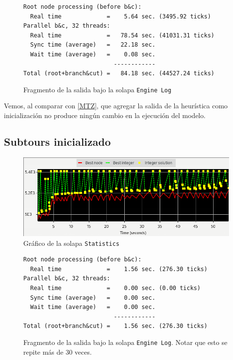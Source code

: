 \documentclass[titlepage,a4paper,oneside]{article}
\begin{document}
\begin{figure}[H]
\begin{verbatim}
Root node processing (before b&c):
  Real time             =    5.64 sec. (3495.92 ticks)
Parallel b&c, 32 threads:
  Real time             =   78.54 sec. (41031.31 ticks)
  Sync time (average)   =   22.18 sec.
  Wait time (average)   =    0.08 sec.
                          ------------
Total (root+branch&cut) =   84.18 sec. (44527.24 ticks)
\end{verbatim}
\caption{Fragmento de la salida bajo la solapa \texttt{Engine Log}}
\end{figure}

Vemos, al comparar con \ref{MTZ}, que agregar la salida de la heurística como inicialización no produce ningún cambio en la ejecución del modelo.

\subsection{Subtours inicializado}
\begin{figure}[H]
\centering
\includegraphics[width=\textwidth]{images/subtours_init.png}
\caption{Gráfico de la solapa \texttt{Statistics}}
\end{figure}

\begin{figure}[H]
\begin{verbatim}
Root node processing (before b&c):
  Real time             =    1.56 sec. (276.30 ticks)
Parallel b&c, 32 threads:
  Real time             =    0.00 sec. (0.00 ticks)
  Sync time (average)   =    0.00 sec.
  Wait time (average)   =    0.00 sec.
                          ------------
Total (root+branch&cut) =    1.56 sec. (276.30 ticks)
\end{verbatim}
\caption{Fragmento de la salida bajo la solapa \texttt{Engine Log}. Notar que esto se repite más de 30 veces.}
\end{figure}



\printbibliography
\end{document}
